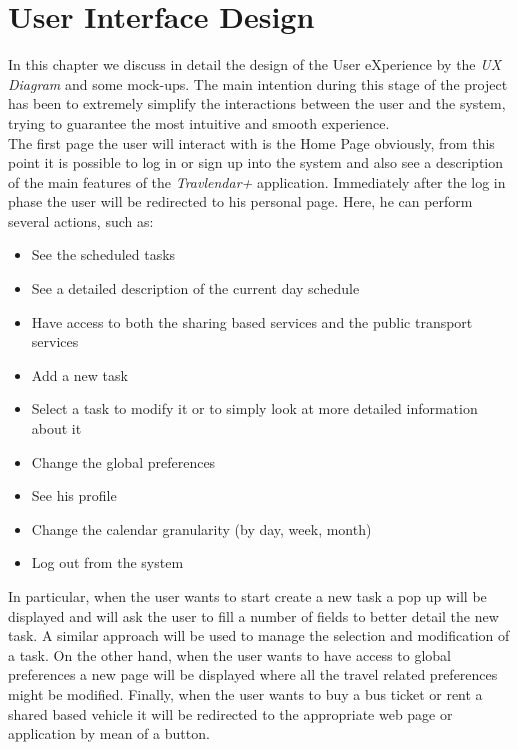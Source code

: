 \chapter{User Interface Design}
In this chapter we discuss in detail the design of the User eXperience by the \emph{UX Diagram} and some mock-ups. The main intention during this stage of the project has been to extremely simplify the interactions between the user and the system, trying to guarantee the most intuitive and smooth experience. 
\\The first page the user will interact with is the Home Page obviously, from this point it is possible to log in or sign up into the system and also see a description of the main features of the \emph{Travlendar+} application.
Immediately after the log in phase the user will be redirected to his personal page. Here, he can perform several actions, such as: 
\begin{itemize}
    \item See the scheduled tasks
    \item See a detailed description of the current day schedule
    \item Have access to both the sharing based services and the public transport services 
    \item Add a new task
    \item Select a task to modify it or to simply look at more detailed information about it
    \item Change the global preferences
    \item See his profile
    \item Change the calendar granularity (by day, week, month)
    \item Log out from the system 
\end{itemize}  
In particular, when the user wants to start create a new task a pop up will be displayed and will ask the user to fill a number of fields to better detail the new task. A similar approach will be used to manage the selection and modification of a task.
On the other hand, when the user wants to have access to global preferences a new page will be displayed where all the travel related preferences might be modified. 
Finally, when the user wants to buy a bus ticket or rent a shared based vehicle it will be redirected to the appropriate web page or application by mean of a button. 

